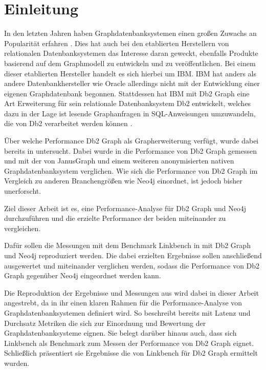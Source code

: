 \chapter{Einleitung}
\label{einleitung}

In den letzten Jahren haben Graphdatenbanksystemen einen großen Zuwachs an Popularität erfahren \cite{db_engines_ranking_july}. Dies hat auch bei den etablierten Herstellern von relationalen Datenbanksystemen das Interesse daran geweckt, ebenfalls Produkte basierend auf dem Graphmodell zu entwickeln und zu veröffentlichen. Bei einem dieser etablierten Hersteller handelt es sich hierbei um IBM. IBM hat anders als andere Datenbankhersteller wie Oracle allerdings nicht mit der Entwicklung einer eigenen Graphdatenbank begonnen. Stattdessen hat IBM mit Db2 Graph eine Art Erweiterung für sein relationale Datenbanksystem Db2 entwickelt, welches dazu in der Lage ist lesende Graphanfragen in SQL-Anweisungen umzuwandeln, die von Db2 verarbeitet werden können \cite{sigmod_tian}. 

Über welche Performance Db2 Graph als Grapherweiterung verfügt, wurde dabei bereits in \cite{sigmod_tian} untersucht. Dabei wurde in \cite{sigmod_tian} die Performance von Db2 Graph gemessen und mit der von JanusGraph und einem weiteren anonymisierten nativen Graphdatenbanksystem verglichen. Wie sich die Performance von Db2 Graph im Vergleich zu anderen Branchengrößen wie Neo4j einordnet, ist jedoch bisher unerforscht. 

Ziel dieser Arbeit ist es, eine Performance-Analyse für Db2 Graph und Neo4j durchzuführen und die erzielte Performance der beiden miteinander zu vergleichen. 

Dafür sollen die Messungen mit dem Benchmark Linkbench in \cite{sigmod_tian} mit Db2 Graph und Neo4j reproduziert werden. Die dabei erzielten Ergebnisse sollen anschließend ausgewertet und miteinander verglichen werden, sodass die Performance von Db2 Graph gegenüber Neo4j eingeordnet werden kann.

Die Reproduktion der Ergebnisse und Messungen aus \cite{sigmod_tian} wird dabei in dieser Arbeit angestrebt, da in ihr einen klaren Rahmen für die Performance-Analyse von Graphdatenbanksystemen definiert wird. So beschreibt \cite{sigmod_tian} bereits mit Latenz und Durchsatz Metriken die sich zur Einordnung und Bewertung der Graphdatenbanksysteme eignen. Sie belegt darüber hinaus auch, dass sich Linkbench als Benchmark zum Messen der Performance von Db2 Graph eignet. Schließlich präsentiert sie Ergebnisse die von Linkbench für Db2 Graph ermittelt wurden. 

